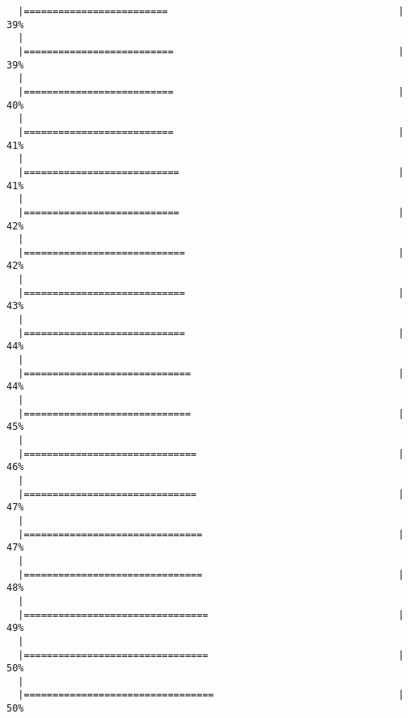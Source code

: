 \begin{knitrout}
\begin{kframe}
\begin{verbatim}
  |=========================                                        |  39%
  |                                                                       
  |==========================                                       |  39%
  |                                                                       
  |==========================                                       |  40%
  |                                                                       
  |==========================                                       |  41%
  |                                                                       
  |===========================                                      |  41%
  |                                                                       
  |===========================                                      |  42%
  |                                                                       
  |============================                                     |  42%
  |                                                                       
  |============================                                     |  43%
  |                                                                       
  |============================                                     |  44%
  |                                                                       
  |=============================                                    |  44%
  |                                                                       
  |=============================                                    |  45%
  |                                                                       
  |==============================                                   |  46%
  |                                                                       
  |==============================                                   |  47%
  |                                                                       
  |===============================                                  |  47%
  |                                                                       
  |===============================                                  |  48%
  |                                                                       
  |================================                                 |  49%
  |                                                                       
  |================================                                 |  50%
  |                                                                       
  |=================================                                |  50%

\end{verbatim}
\end{kframe}
\end{knitrout}
